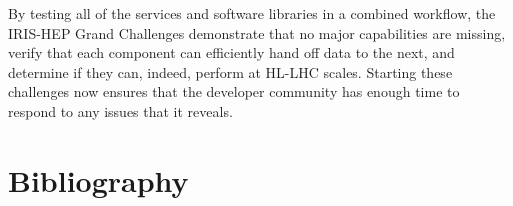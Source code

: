 \documentclass[12pt,a4paper]{article}
\begin{document}
By testing all of the services and software libraries in a combined workflow, the IRIS-HEP Grand Challenges demonstrate that no major capabilities are missing, verify that each component can efficiently hand off data to the next, and determine if they can, indeed, perform at HL-LHC scales. Starting these challenges now ensures that the developer community has enough time to respond to any issues that it reveals.

\section{Bibliography}

\printbibliography
\end{document}
